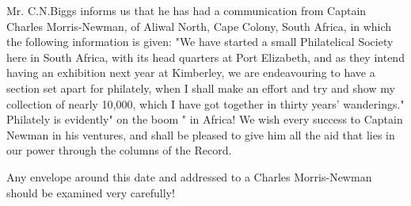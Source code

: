 \begin{blockquote}
Mr. C.N.Biggs informs us that he has had a communication from
Captain Charles Morris-Newman, of Aliwal North, Cape Colony, South Africa, in which the following information is given: "We have
started a small Philatelical Society here in South Africa, with its head
quarters at Port Elizabeth, and as they intend having an exhibition next
year at Kimberley, we are endeavouring to have a section set apart for philately, when I shall make an effort and try and show my collection
of nearly 10,000, which I have got together in thirty years' wanderings."
Philately is evidently" on the boom " in Africa! We wish every
success to Captain Newman in his ventures, and shall be pleased to give him all the aid that lies in our power through the columns of the
Record.
\end{blockquote}

Any envelope around this date and addressed to a Charles Morris-Newman should be examined very carefully!













 

                           